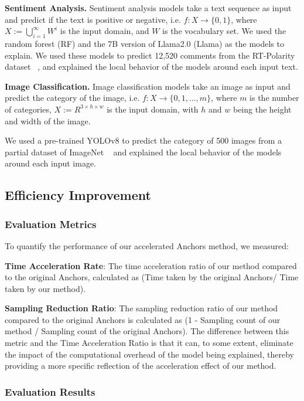 \textbf{Sentiment Analysis.} Sentiment analysis models take a text sequence as input and predict if the text is positive or negative, i.e. $f: X \rightarrow \{0, 1\}$, where $X:= \bigcup_{i=1}^\infty W^i$ is the input domain, and $W$ is the vocabulary set. We used the random forest (RF) and the 7B version of Llama2.0 (Llama) as the models to explain. We used these models to predict 12,520 comments from the RT-Polarity dataset ~\cite{rt-polarity}, and explained the local behavior of the models around each input text.

\textbf{Image Classification.} Image classification models take an image as input and predict the category of the image, i.e. $f: X \rightarrow \{0, 1, ..., m\}$, where $m$ is the number of categories, $X:= R^{3\times h\times w}$ is the input domain, with $h$ and $w$ being the height and width of the image.

We used a pre-trained YOLOv8 to predict the category of 500 images from a partial dataset of ImageNet ~\cite{imagenet} and explained the local behavior of the models around each input image.

\subsection{Efficiency Improvement}

\subsubsection{Evaluation Metrics}

To quantify the performance of our accelerated Anchors method, we measured:

\textbf{Time Acceleration Rate}: The time acceleration ratio of our method compared to the original Anchors, calculated as (Time taken by the original Anchors/ Time taken by our method).

\textbf{Sampling Reduction Ratio}: The sampling reduction ratio of our method compared to the original Anchors is calculated as (1 - Sampling count of our method / Sampling count of the original Anchors). The difference between this metric and the Time Acceleration Ratio is that it can, to some extent, eliminate the impact of the computational overhead of the model being explained, thereby providing a more specific reflection of the acceleration effect of our method.

\subsubsection{Evaluation Results}

